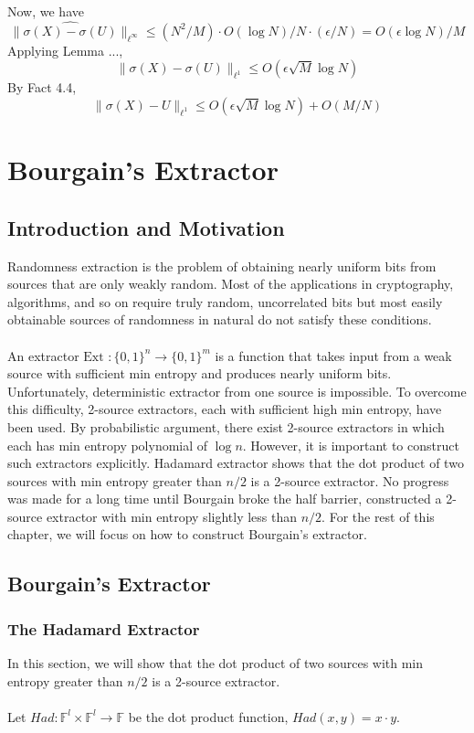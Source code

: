 \noindent Now, we have
$$\|\widehat{ \sigma(X) - \sigma(U)} \|_{\ell^{\infty}} \leq (N^2/M)\cdot O(\log N)/N \cdot (\epsilon/N) = O(\epsilon \log N)/M$$ 
Applying Lemma ..., 
$$\|\sigma(X) - \sigma(U) \|_{\ell^{1}} \leq O(\epsilon \sqrt{M}\log N)$$
By Fact 4.4, 
$$\|\sigma(X) - U \|_{\ell^{1}} \leq O(\epsilon \sqrt{M}\log N) + O(M/N)$$ 
\chapter{Bourgain's Extractor}

\section{Introduction and Motivation}

Randomness extraction is the problem of obtaining nearly uniform bits from sources that are 	only weakly random. Most of the applications in cryptography, algorithms, and so on require truly random, uncorrelated bits but most easily obtainable sources of randomness in natural do not satisfy these conditions. \\ \\
An extractor $\text{Ext } : \{ 0,1 \}^n \rightarrow \{0, 1 \} ^m$ is a function that takes input from a weak source with sufficient min entropy and produces nearly uniform bits. Unfortunately, deterministic extractor from one source is impossible. To overcome this difficulty, 2-source extractors, each with sufficient high min entropy, have been used. By probabilistic argument, there exist 2-source extractors in which each has min entropy polynomial of $\log n$. However, it is important to construct such extractors explicitly. Hadamard extractor shows that the dot product of two sources with min entropy greater than $n/2$ is a 2-source extractor. No progress was made for a long time until Bourgain broke the half barrier, constructed a 2-source extractor with min entropy slightly less than $n/2$. For the rest of this chapter, we will focus on how to construct Bourgain's extractor.

\section{Bourgain's Extractor}

\subsection{The Hadamard Extractor}
In this section, we will show that the dot product of two sources with min entropy greater than $n/2$ is a 2-source extractor. \\ \\
Let $Had: \mathbb{F}^l \times \mathbb{F}^l \rightarrow \mathbb{F}$ be the dot product function, $Had(x,y) = x \cdot y$. \\ \\

